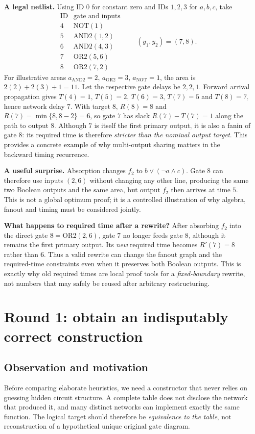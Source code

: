 \documentclass[a4paper,10pt]{article}
\theoremstyle{definition}
\theoremstyle{remark}
\begin{document}
\textbf{A legal netlist.} Using ID $0$ for constant zero and IDs $1,2,3$ for $a,b,c$, take
\[
\begin{array}{c|l}
\text{ID}&\text{gate and inputs}\\\hline
4&\mathrm{NOT}(1)\\
5&\mathrm{AND2}(1,2)\\
6&\mathrm{AND2}(4,3)\\
7&\mathrm{OR2}(5,6)\\
8&\mathrm{OR2}(7,2)
\end{array}
\qquad(y_1,y_2)=(7,8).
\]
For illustrative areas $a_{\mathrm{AND2}}=2$, $a_{\mathrm{OR2}}=3$, $a_{\mathrm{NOT}}=1$, the area is $2(2)+2(3)+1=11$. Let the respective gate delays be $2,2,1$. Forward arrival propagation gives $T(4)=1$, $T(5)=2$, $T(6)=3$, $T(7)=5$ and $T(8)=7$, hence network delay $7$. With target $8$, $R(8)=8$ and $R(7)=\min\{8,8-2\}=6$, so gate $7$ has slack $R(7)-T(7)=1$ along the path to output $8$. Although $7$ is itself the first primary output, it is also a fanin of gate $8$: its required time is therefore \emph{stricter than the nominal output target}. This provides a concrete example of why multi-output sharing matters in the backward timing recurrence.

\textbf{A useful surprise.} Absorption changes $f_2$ to $b\lor(\neg a\land c)$. Gate $8$ can therefore use inputs $(2,6)$ without changing any other line, producing the same two Boolean outputs and the same area, but output $f_2$ then arrives at time $5$. This is not a global optimum proof; it is a controlled illustration of why algebra, fanout and timing must be considered jointly.

\textbf{What happens to required time after a rewrite?} After absorbing $f_2$ into the direct gate $8=\mathrm{OR2}(2,6)$, gate $7$ no longer feeds gate $8$, although it remains the first primary output. Its \emph{new} required time becomes $R'(7)=8$ rather than $6$. Thus a valid rewrite can change the fanout graph and the required-time constraints even when it preserves both Boolean outputs. This is exactly why old required times are local proof tools for a \emph{fixed-boundary} rewrite, not numbers that may safely be reused after arbitrary restructuring.

\section{Round 1: obtain an indisputably correct construction}
\subsection{Observation and motivation}
Before comparing elaborate heuristics, we need a constructor that never relies on guessing hidden circuit structure. A complete table does not disclose the network that produced it, and many distinct networks can implement exactly the same function. The logical target should therefore be \emph{equivalence to the table}, not reconstruction of a hypothetical unique original gate diagram.
\end{document}
